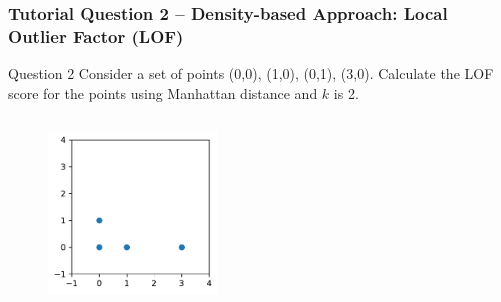 \documentclass[aspectratio=169, 10pt]{beamer}
\begin{document}
\begin{frame}
    \frametitle{Tutorial Question 2 -- Density-based Approach: Local Outlier Factor (LOF)}
    \small

    \begin{block}{Question 2}
        Consider a set of points (0,0), (1,0), (0,1), (3,0). 
        Calculate the LOF score for the points using Manhattan distance and $k$ is 2.
    \end{block}
    
    \begin{columns}[t]
        \begin{column}{0.5\textwidth}

            \begin{figure}
                \centering
                \includegraphics[width=0.4\textwidth]{../imgs/outlier_lof.pdf}
            \end{figure}


\end{column}
\end{columns}
\end{frame}
\end{document}
